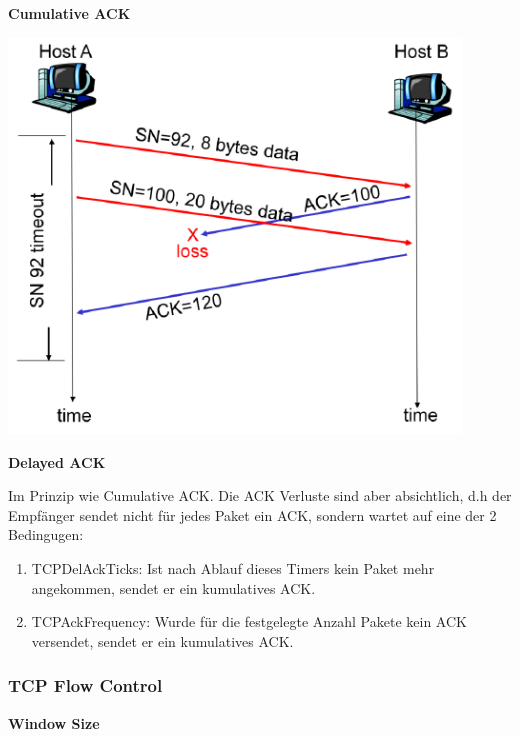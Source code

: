 \begin{minipage}[t]{0.5\linewidth}
	\textbf{Cumulative ACK}

	\vspace{5mm}

	\includegraphics[width=0.9\textwidth]{media/cumulativeACK.png}\\
\end{minipage}
\begin{minipage}[t]{0.5\linewidth}
	\textbf{Delayed ACK}

	\vspace{5mm}

	Im Prinzip wie Cumulative ACK. Die ACK Verluste sind aber absichtlich, d.h der
	Empfänger sendet nicht für jedes Paket ein ACK, sondern wartet auf eine der 2
	Bedingugen:

	\begin{enumerate}
		\item TCPDelAckTicks: Ist nach Ablauf dieses Timers kein Paket mehr
			angekommen, sendet er ein kumulatives ACK.
		\item TCPAckFrequency: Wurde für die festgelegte Anzahl Pakete kein ACK
			versendet, sendet er ein kumulatives ACK.
	\end{enumerate}
\end{minipage}

\subsubsection{TCP Flow Control}

\textbf{Window Size}\\

